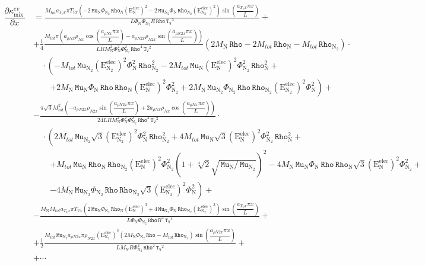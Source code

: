 \documentclass[10pt]{article}
\newcommand{\diff}[2] {\dfrac{\partial #1 }{\partial #2}}
\newcommand{\Rho}{\,\mathtt{Rho}}
\newcommand{\TV}{\,\mathtt{T_V}}
\newcommand{\N}{\text{N}}
\newcommand{\elec}{\text{elec}}
\newcommand{\E}{\text{E}}
\newcommand{\Mu}{\, \mathtt{Mu}}
\newcommand{\mix}{\text{mix}\,}
\newcommand{\DKappaevDx}{\diff{\kappa^{ev}_{\mix}}{x}\,}
\begin{document}
\begin{equation}
\begin{split}\label{eq:DKappaevDx}
\DKappaevDx &= \frac{M_{tot} a_{T_V x} \pi T_{Vx} \left(- 2 \Mu_{\N} \Phi_{\N_2} \Rho_{\N} \left( \E^{\elec}_{\N} \right)^2 - 2
\Mu_{\N_2} \Phi_{\N} \Rho_{\N_2} \left( \E^{\elec}_{\N_2} \right)^2\right) \sin\left(\dfrac{a_{T_V x} \pi x}{L}\right)}{L
\Phi_{\N} \Phi_{\N_2} R \Rho \TV^{3}} +\\ 
%
&+ \frac{1}{4}\frac{M_{tot} \pi \left(a_{\rho N x} \rho_{N x} \cos\left(\dfrac{a_{\rho N x} \pi x}{L}\right) - a_{\rho N2 x}
\rho_{N2 x} \sin\left(\dfrac{a_{\rho N2 x} \pi x}{L}\right)\right) }{L R M_{\N}^{2} \Phi_{\N}^{2} \Phi_{\N_2}^{2} \Rho^{4}
\TV^{2}}  \left(2 M_{\N} \Rho - 2 M_{tot} \Rho_{\N} - M_{tot} \Rho_{\N_2}\right) \cdot\\
 &\quad \cdot\left(- M_{tot} \Mu_{\N_2} \left( \E^{\elec}_{\N_2} \right)^2 \Phi_{\N}^{2} \Rho_{\N_2}^{2} - 2 M_{tot} \Mu_{\N}
\left( \E^{\elec}_{\N} \right)^2 \Phi_{\N_2}^{2} \Rho_{\N}^{2}\right.+\\
 &\quad\quad\left. + 2 M_{\N} \Mu_{\N} \Phi_{\N} \Rho \Rho_{\N} \left( \E^{\elec}_{\N} \right)^2 \Phi_{\N_2}^{2} + 2 M_{\N}
\Mu_{\N_2} \Phi_{\N_2} \Rho \Rho_{\N_2} \left( \E^{\elec}_{\N_2} \right)^2 \Phi_{\N}^{2}\right) +\\ 
%
&- \frac{\pi \sqrt{3} M_{tot}^{2} \left(- a_{\rho N2 x} \rho_{N2 x} \sin\left(\dfrac{a_{\rho N2 x} \pi x}{L}\right) + 2 a_{\rho N
x} \rho_{N x} \cos\left(\dfrac{a_{\rho N x} \pi x}{L}\right)\right) }{24 L R M_{\N}^{2} \Phi_{\N}^{2} \Phi_{\N_2}^{2} \Rho^{3}
\TV^{2}} \cdot\\
 &\quad \cdot\left(2 M_{tot} \Mu_{\N_2} \sqrt{3} \left( \E^{\elec}_{\N_2} \right)^2 \Phi_{\N}^{2} \Rho_{\N_2}^{2} + 4 M_{tot}
\Mu_{\N} \sqrt{3} \left( \E^{\elec}_{\N} \right)^2 \Phi_{\N_2}^{2} \Rho_{\N}^{2} \right.+\\
 &\quad\quad\left.+ M_{tot} \Mu_{\N} \Rho_{\N} \Rho_{\N_2} \left( \E^{\elec}_{\N} \right)^2 \Phi_{\N_2}^{2} \left(1 + \sqrt[4]{2}
\sqrt{ \Mu_{\N} / \Mu_{\N_2} }\right)^{2} - 4 M_{\N} \Mu_{\N} \Phi_{\N} \Rho \Rho_{\N} \sqrt{3} \left( \E^{\elec}_{\N} \right)^2
\Phi_{\N_2}^{2} \right.+\\
 &\quad\quad\left.- 4 M_{\N} \Mu_{\N_2} \Phi_{\N_2} \Rho \Rho_{\N_2} \sqrt{3} \left( \E^{\elec}_{\N_2} \right)^2
\Phi_{\N}^{2}\right) +\\ 
%
&- \frac{M_{\N} M_{tot} a_{T_V x} \pi T_{Vx} \left(2 \Mu_{\N} \Phi_{\N_2} \Rho_{\N} \left( \E^{\elec}_{\N} \right)^3 + 4
\Mu_{\N_2} \Phi_{\N} \Rho_{\N_2} \left( \E^{\elec}_{\N_2} \right)^3\right) \sin\left(\dfrac{a_{T_V x} \pi x}{L}\right)}{L
\Phi_{\N} \Phi_{\N_2} \Rho R^{2} \TV^{4}} +\\ 
%
&+ \frac{1}{2}\frac{M_{tot} \Mu_{\N_2} a_{\rho N2 x} \pi \rho_{N2 x} \left( \E^{\elec}_{\N_2} \right)^2  \left(2 M_{\N}
\Phi_{\N_2} \Rho - M_{tot} \Rho_{\N_2} \right) \sin\left(\dfrac{a_{\rho N2 x} \pi x}{L}\right)}{L M_{\N} R \Phi_{\N_2}^{2}
\Rho^{2} \TV^{2}} +\\ 
%
%
&+\cdots \\
\end{split}
\end{equation}
\end{document}
